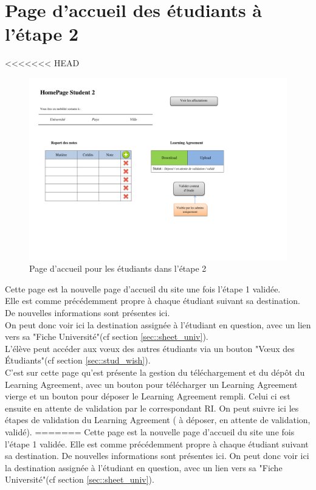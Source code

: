\section{Page d'accueil des étudiants à l'étape 2}

<<<<<<< HEAD

\begin{figure}[H]
	\includegraphics[scale=0.6]{Etudiant/HomePageSt2.pdf}
	\caption{Page d'accueil pour les étudiants dans l'étape 2}
\end{figure}

Cette page est la nouvelle page d'accueil du site une fois l'étape 1 validée.\\
Elle est comme précédemment propre à chaque étudiant suivant sa destination. De nouvelles informations sont présentes ici.\\
On peut donc voir ici la destination assignée à l'étudiant en question, avec un lien vers sa "Fiche Université"(cf section \ref{sec::sheet_univ}).\\
L'élève peut accéder aux vœux des autres étudiants via un bouton "Vœux des Étudiants"(cf section \ref{sec::stud_wish}).\\
C'est sur cette page qu'est présente la gestion du téléchargement et du dépôt du Learning Agreement, avec un bouton pour télécharger un Learning Agreement vierge et un bouton pour déposer le Learning Agreement rempli.
Celui ci est ensuite en attente de validation par le correspondant RI. On peut suivre ici les étapes de validation du Learning Agreement ( à déposer, en attente de validation, validé).
=======
Cette page est la nouvelle page d'accueil du site une fois l'étape 1 validée.
Elle est comme précédemment propre à chaque étudiant suivant sa destination. De nouvelles informations sont présentes ici.
On peut donc voir ici la destination assignée à l'étudiant en question, avec un lien vers sa "Fiche Université"(cf section \ref{sec::sheet_univ}).

